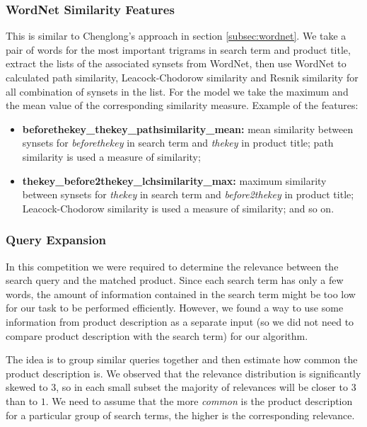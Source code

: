 \documentclass[12pt]{article}
\begin{document}
\subsubsection{WordNet Similarity Features}
\label{subsubsec:wordnet_IandK}

This is similar to Chenglong's approach in section \ref{subsec:wordnet}. We take a pair of words for the most important trigrams in search term and product title, extract the lists of the associated synsets from WordNet, then use WordNet to calculated path similarity, Leacock-Chodorow similarity and Resnik similarity for all combination of synsets in the list. For the model we take the maximum and the mean value of the corresponding similarity measure.  Example of the features:
\begin{itemize}
\item \textbf{beforethekey\_thekey\_pathsimilarity\_mean:} mean similarity between synsets for \emph{beforethekey} in search term and  \emph{thekey} in product title; path similarity is used a measure of similarity;
\item \textbf{thekey\_before2thekey\_lchsimilarity\_max:} maximum similarity between synsets for \emph{thekey} in search term and  \emph{before2thekey} in product title; Leacock-Chodorow similarity is used a measure of similarity; and so on.
\end{itemize}

\subsubsection{Query Expansion}
\label{subsubsec:queryexpansion_IandK}

In this competition we were required to determine the relevance between the search query and the matched product. Since each search term has only a few words, the amount of information contained in the search term might be too low for our task to be performed efficiently. However, we found a way to use some information from product description as a separate input (so we did not need to compare product description with the search term) for our algorithm.

The idea is to group similar queries together and then estimate how common the product description is. We observed that the relevance distribution is significantly skewed to $3$, so in each small subset the majority of relevances will be closer to $3$ than to $1$. We need to assume that the more \emph{common} is the product description for a particular group of search terms, the higher is the corresponding relevance.
\end{document}
